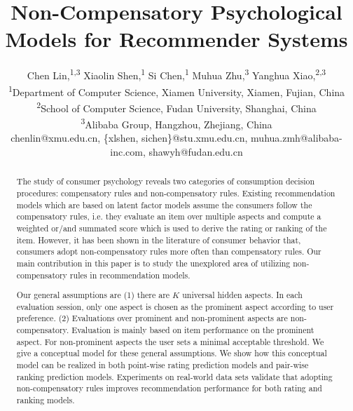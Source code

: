 \documentclass[letterpaper]{article} %
\begin{document}
\title{Non-Compensatory Psychological Models for Recommender Systems}
\author{Chen Lin,\textsuperscript{\rm 1,\rm 3} Xiaolin Shen,\textsuperscript{\rm 1} Si Chen,\textsuperscript{\rm 1} Muhua Zhu,\textsuperscript{\rm 3} Yanghua Xiao,\textsuperscript{\rm 2,3}\\
\textsuperscript{\rm 1}Department of Computer Science, Xiamen University, Xiamen, Fujian, China\\
\textsuperscript{\rm 2}School of Computer Science, Fudan University, Shanghai, China \\
\textsuperscript{\rm 3}Alibaba Group, Hangzhou, Zhejiang, China\\
chenlin@xmu.edu.cn, \{xlshen, sichen\}@stu.xmu.edu.cn, muhua.zmh@alibaba-inc.com, shawyh@fudan.edu.cn}
\setlength\titlebox{2.5in}

\maketitle
\begin{abstract}
The study of consumer psychology reveals two categories of consumption decision procedures: compensatory rules and non-compensatory rules. Existing recommendation models which are based on latent factor models assume the consumers follow the compensatory rules, i.e. they evaluate an item over multiple aspects and compute a weighted or/and summated score which is used to derive the rating or ranking of the item. However, it has been shown in the literature of consumer behavior that, consumers adopt non-compensatory rules more often than compensatory rules. Our main contribution in this paper is to study the unexplored area of utilizing non-compensatory rules in recommendation models. 

Our general assumptions are (1) there are $K$ universal hidden aspects. In each evaluation session, only one aspect is chosen as the prominent aspect according to user preference. (2) Evaluations over prominent and non-prominent aspects are non-compensatory. Evaluation is mainly based on item performance on the prominent aspect. For non-prominent aspects the user sets a minimal acceptable threshold. We give a conceptual model for these general assumptions. We show how this conceptual model can be realized in both point-wise rating prediction models and pair-wise ranking prediction models. Experiments on real-world data sets validate that adopting non-compensatory rules improves recommendation performance for both rating and ranking models.
\end{abstract}
\end{document}
